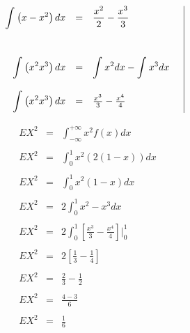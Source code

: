 \documentclass[12pt]{article}
\begin{document}
\begin{center}
\begin{equation*}
\begin{array}{c|c}
\begin{array}{l}
\begin{array}{rcl}
                        \displaystyle\int_{}^{}\left(x-x^2\right)dx & = & \displaystyle\frac{x^2}{2} - \frac{x^3}{3}
                        \vspace{1cm}
                        \\
                        \displaystyle\int_{}^{}\left(x^2x^3\right)dx & = & \displaystyle\int_{}^{}x^2dx-\int_{}^{}x^3dx
                        \\
                        \\
                        \displaystyle\int_{}^{}\left(x^2x^3\right)dx & = & 
                        \frac{x^3}{3}-\frac{x^4}{4}
                    \end{array}
                \end{array}
            \end{array}
        \end{equation*}
    \end{center}

    \begin{center}
        \begin{equation*}
            \begin{array}{rcl}
                EX^2 & = & \displaystyle\int_{-\infty}^{+\infty}x^2 f(x) dx
                \\
                \\
                EX^2 & = &  \displaystyle\int_{0}^{1}x^2 (2\left(1-x\right)) dx
                \\
                \\
                EX^2 & = & \displaystyle\int_{0}^{1}x^2 \left(1-x\right) dx
                \\
                \\
                EX^2 & = & \displaystyle 2\int_{0}^{1}x^2 -x^3 dx
                \\
                \\
                EX^2 & = & \displaystyle 2 \int_{0}^{1}\left[\frac{x^3}{3}- \frac{x^4}{4}\right]\vert_{0}^{1}
                \\
                \\
                EX^2 & = & \displaystyle 2\left[\frac{1}{3}-\frac{1}{4}\right] 
                \\
                \\
                EX^2 & = & \displaystyle \frac{2}{3} - \frac{1}{2}
                \\
                \\
                EX^2 & = & \displaystyle \frac{4-3}{6} 
                \\
                \\
                EX^2 & = & \displaystyle \frac{1}{6} 
            \end{array}
        \end{equation*}
    \end{center}
\end{document}
